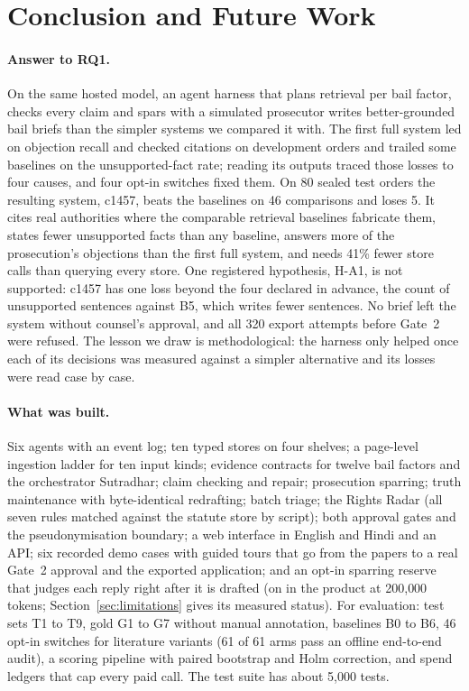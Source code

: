 \section{Conclusion and Future Work}
\label{sec:conclusion}

\paragraph{Answer to RQ1.} On the same hosted model, an agent harness that plans retrieval per bail factor, checks every claim and spars with a simulated prosecutor writes better-grounded bail briefs than the simpler systems we compared it with. The first full system led on objection recall and checked citations on development orders and trailed some baselines on the unsupported-fact rate; reading its outputs traced those losses to four causes, and four opt-in switches fixed them. On 80 sealed test orders the resulting system, c1457, beats the baselines on 46 comparisons and loses 5. It cites real authorities where the comparable retrieval baselines fabricate them, states fewer unsupported facts than any baseline, answers more of the prosecution's objections than the first full system, and needs 41\% fewer store calls than querying every store. One registered hypothesis, H-A1, is not supported: c1457 has one loss beyond the four declared in advance, the count of unsupported sentences against B5, which writes fewer sentences. No brief left the system without counsel's approval, and all 320 export attempts before Gate~2 were refused. The lesson we draw is methodological: the harness only helped once each of its decisions was measured against a simpler alternative and its losses were read case by case.

\paragraph{What was built.} Six agents with an event log; ten typed stores on four shelves; a page-level ingestion ladder for ten input kinds; evidence contracts for twelve bail factors and the orchestrator Sutradhar; claim checking and repair; prosecution sparring; truth maintenance with byte-identical redrafting; batch triage; the Rights Radar (all seven rules matched against the statute store by script); both approval gates and the pseudonymisation boundary; a web interface in English and Hindi and an API; six recorded demo cases with guided tours that go from the papers to a real Gate~2 approval and the exported application; and an opt-in sparring reserve that judges each reply right after it is drafted (on in the product at 200{,}000 tokens; Section~\ref{sec:limitations} gives its measured status). For evaluation: test sets T1 to T9, gold G1 to G7 without manual annotation, baselines B0 to B6, 46 opt-in switches for literature variants (61 of 61 arms pass an offline end-to-end audit), a scoring pipeline with paired bootstrap and Holm correction, and spend ledgers that cap every paid call. The test suite has about 5,000 tests.

